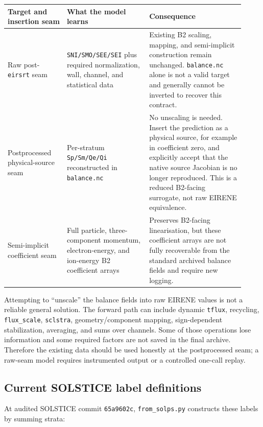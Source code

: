 \documentclass[11pt]{article}
\begin{document}
\begin{longtable}{@{}p{0.23\linewidth}p{0.32\linewidth}p{0.37\linewidth}@{}}
\toprule
Target and insertion seam & What the model learns & Consequence \\
\midrule
\endhead
Raw post-\texttt{eirsrt} seam & \texttt{SNI/SMO/SEE/SEI} plus required normalization, wall, channel, and statistical data & Existing B2 scaling, mapping, and semi-implicit construction remain unchanged. \texttt{balance.nc} alone is not a valid target and generally cannot be inverted to recover this contract. \\
Postprocessed physical-source seam & Per-stratum \texttt{Sp/Sm/Qe/Qi} reconstructed in \texttt{balance.nc} & No unscaling is needed. Insert the prediction as a physical source, for example in coefficient zero, and explicitly accept that the native source Jacobian is no longer reproduced. This is a reduced B2-facing surrogate, not raw EIRENE equivalence. \\
Semi-implicit coefficient seam & Full particle, three-component momentum, electron-energy, and ion-energy B2 coefficient arrays & Preserves B2-facing linearisation, but these coefficient arrays are not fully recoverable from the standard archived balance fields and require new logging. \\
\bottomrule
\end{longtable}

Attempting to ``unscale'' the balance fields into raw EIRENE values is not a reliable general solution. The forward path can include dynamic \texttt{tflux}, recycling, \texttt{flux\_scale}, \texttt{sclstra}, geometry/component mapping, sign-dependent stabilization, averaging, and sums over channels. Some of those operations lose information and some required factors are not saved in the final archive. Therefore the existing data should be used honestly at the postprocessed seam; a raw-seam model requires instrumented output or a controlled one-call replay.

\subsection{Current SOLSTICE label definitions}

At audited SOLSTICE commit \texttt{65a9602c}, \texttt{from\_solps.py} constructs these labels by summing strata:
\end{document}
